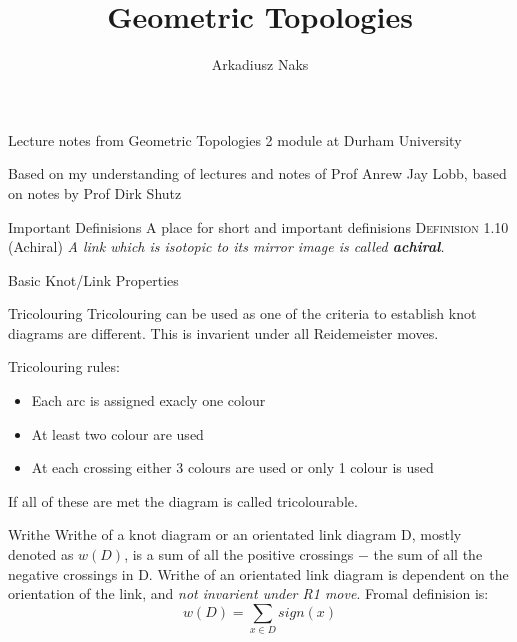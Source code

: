 \documentclass[12pt, letterpaper]{article}
\title{Geometric Topologies}
\author{Arkadiusz Naks}
\begin{document}
\begin{titlepage}
  \begin{center}
    \makeatletter
    \vspace*{1cm}
    \Huge
    \textbf{\@title}

    \vspace{0.5cm}
    \Large
    Lecture notes from Geometric Topologies 2 module at Durham University

    \vspace{1.5cm}

    \textbf{\@author}

    \vfill

    \vspace{0.8cm}

    \small
    Based on my understanding of lectures and notes of Prof Anrew Jay Lobb, based on notes by Prof Dirk Shutz
    \@date{}
  \end{center}
\end{titlepage}

\tableofcontents
\newpage

\begin{section}{Important Definisions}
  A place for short and important definisions
  \textsc{Definision 1.10} (Achiral) \textit{A link which is isotopic to its mirror image is called \textbf{achiral}.}
\end{section}

\begin{section}{Basic Knot/Link Properties}

  \begin{subsection}{Tricolouring}
    Tricolouring can be used as one of the criteria to establish knot diagrams are different.
    This is invarient under all Reidemeister moves.

    Tricolouring rules:
    \begin{itemize}
      \item Each arc is assigned exacly one colour
      \item At least two colour are used
      \item At each crossing either 3 colours are used or only 1 colour is used
    \end{itemize}
    If all of these are met the diagram is called tricolourable.
  \end{subsection}

  \begin{subsection}{Writhe}
    Writhe of a knot diagram or an orientated link diagram D, mostly denoted as \(w(D)\),
    is a sum of all the positive crossings \(-\) the sum of all the negative crossings in D.
    Writhe of an orientated link diagram is dependent on the orientation of the link,
    and \emph{not invarient under R1 move}.
    Fromal definision is: \[w(D) = \sum_{x \in D} sign(x)\]
  \end{subsection}

\end{section}
\end{document}
